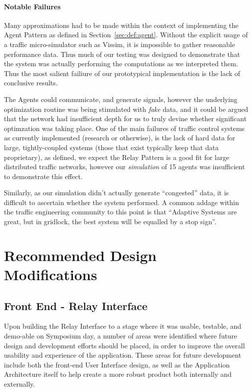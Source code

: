 \documentclass{report}
\begin{document}
\subsubsection{Notable Failures}
Many approximations had to be made within the context of implementing the Agent Pattern as defined in Section~\ref{sec:def:agent}.
Without the explicit usage of a traffic micro-simulator such as Vissim, it is impossible to gather reasonable performance data.
Thus much of our testing was designed to demonstrate that the system was actually performing the computations as we interpreted them.
Thus the most salient failiure of our prototypical implementation is the lack of conclusive results.

The Agents could communicate, and generate signals, however the underlying optimization routine was being stimulated with \emph{fake} data, and it could be argued that the network had insufficient depth for us to truly devine whether significant optimzation was taking place.
One of the main failures of traffic control systems as currently implemented (research or otherwise), is the lack of hard data for large, tightly-coupled systems (those that exist typically keep that data proprietary), as defined, we expect the Relay Pattern is a good fit for large distributed traffic networks, however our \emph{simulation} of 15 agents was insufficient to demonstrate this effect.

Similarly, as our simulation didn't actually generate ``congested'' data, it is difficult to ascertain whether the system performed.
A common addage within the traffic engineering community to this point is that ``Adaptive Systems are great, but in gridlock, the best system will be equalled by a stop sign''.

\newpage
\chapter{Recommended Design Modifications}
\label{chap:improvements}

\section{Front End - Relay Interface}
Upon building the Relay Interface to a stage where it was usable, testable, and demo-able on Symposium day, a number of areas were identified where future design and development efforts should be placed, in order to improve the overall usability and experience of the application.
These areas for future development include both the front-end User Interface design, as well as the Application Architecture itself to help create a more robust product both internally and externally.
\end{document}
